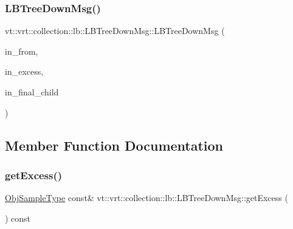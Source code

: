 \subsubsection{\texorpdfstring{L\+B\+Tree\+Down\+Msg()}{LBTreeDownMsg()}\hspace{0.1cm}{\footnotesize\ttfamily [2/2]}}
{\footnotesize\ttfamily vt\+::vrt\+::collection\+::lb\+::\+L\+B\+Tree\+Down\+Msg\+::\+L\+B\+Tree\+Down\+Msg (\begin{DoxyParamCaption}\item[{\hyperlink{namespacevt_a866da9d0efc19c0a1ce79e9e492f47e2}{Node\+Type} const}]{in\+\_\+from,  }\item[{\hyperlink{structvt_1_1vrt_1_1collection_1_1lb_1_1_hier_l_b_types_a597a60d517207b90e8c7984eac434e8f}{Obj\+Sample\+Type}}]{in\+\_\+excess,  }\item[{bool const}]{in\+\_\+final\+\_\+child }\end{DoxyParamCaption})\hspace{0.3cm}{\ttfamily [inline]}}



\subsection{Member Function Documentation}
\mbox{\label{structvt_1_1vrt_1_1collection_1_1lb_1_1_l_b_tree_down_msg_a262abc83d3f5df7e3971d8a837689335}} 
\subsubsection{\texorpdfstring{get\+Excess()}{getExcess()}}
{\footnotesize\ttfamily \hyperlink{structvt_1_1vrt_1_1collection_1_1lb_1_1_hier_l_b_types_a597a60d517207b90e8c7984eac434e8f}{Obj\+Sample\+Type} const\& vt\+::vrt\+::collection\+::lb\+::\+L\+B\+Tree\+Down\+Msg\+::get\+Excess (\begin{DoxyParamCaption}{ }\end{DoxyParamCaption}) const\hspace{0.3cm}{\ttfamily [inline]}}

\mbox{\label{structvt_1_1vrt_1_1collection_1_1lb_1_1_l_b_tree_down_msg_a73e7f5d97152582a54d54b634b9e0486}} 

